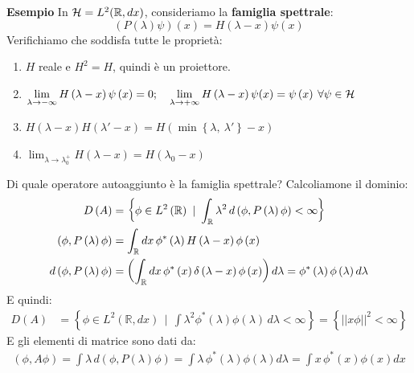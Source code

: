 \documentclass[../../FisicaTeorica.tex]{subfiles}
\begin{document}
\textbf{Esempio} 
In $\mathcal{H} =L^2(\mathbb{R}, dx)$, consideriamo la \textbf{famiglia spettrale}:
\begin{equation}
\left(P\left(\lambda\right)\psi\right)\left(x\right)=H\left(\lambda-x\right)\psi \left(x\right)
\label{eqn:famiglia_spettrale_x}
\end{equation}
Verifichiamo che soddisfa tutte le proprietà:
\begin{enumerate}
    \item $H$ reale e $H^2=H$, quindi è un proiettore.
    \item 
    $\displaystyle \lim_{\lambda\rightarrow-\infty}{H\left(\lambda-x\right)\psi\left(x\right)=0};
    \quad
	\lim_{\lambda\rightarrow+\infty}{H\left(\lambda-x\right)\psi(x)}=\psi
	\left(x\right)\>\forall \psi \in \mathcal{H} $
    \item 
    $\displaystyle H\left(\lambda-x\right)H\left(\lambda '-x\right)=H\left(\min{\left\{\lambda,\ \lambda '\right\}}-x\right)$
    \item 
    $\displaystyle \lim_{\lambda\rightarrow\lambda_0^+}{H\left(\lambda-x\right)}=H\left(\lambda_0-x\right)$
\end{enumerate}
Di quale operatore autoaggiunto è la famiglia spettrale? Calcoliamone il dominio:
\begin{align*}
D\left(A\right)&= \left\{\phi\in L^2\left(\mathbb{R}\right)\ |\ \int_\bb{R}\lambda^2\, d\left(\phi,P\left(\lambda\right)\phi\right)<\infty\right\}\\
\left(\phi,P\left(\lambda\right)\phi\right)&=\int_\bb{R} dx\, \phi^\ast\left(\lambda\right)H\left(\lambda-x\right)\phi \left(x\right)\\
d\left(\phi,P\left(\lambda\right)\phi\right)&=\left(\int_\bb{R} dx\,\phi^\ast\left(x\right)\delta\left(\lambda-x\right)\phi\left(x\right)\right)d\lambda =\phi^\ast\left(\lambda\right)\phi \left(\lambda\right)d\lambda 
\end{align*}
E quindi:
\begin{align*}
D\left(A\right)&= \left\{\phi\in L^2\left(\mathbb{R},dx\right)\ \ |\ \ \int\lambda^2\phi^\ast\left(\lambda\right)\phi\left(\lambda\right)\,d\lambda<\infty\right\}= \left\{\left|\left|x\phi\right|\right|^2<\infty\right\}
\end{align*}
E gli elementi di matrice sono dati da:
\begin{align*}
    \left(\phi,A\phi\right)=\int \lambda\, d\left(\phi,P\left(\lambda\right)\phi\right)= \int \lambda\,\phi^\ast\left(\lambda\right)\phi \left(\lambda\right)d\lambda =\int x\,\phi^\ast\left(x\right)\phi \left(x\right)dx
\end{align*}
\end{document}
